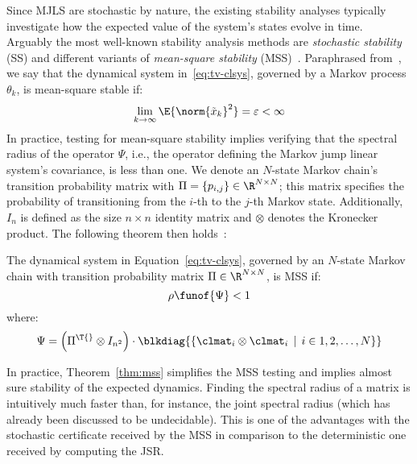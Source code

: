 Since MJLS are stochastic by nature, the existing stability analyses typically investigate how the expected value of the system's states evolve in time.
Arguably the most well-known stability analysis methods are \emph{stochastic stability} (SS) and different variants of \emph{mean-square stability} (MSS)~\cite{Feng:1992}.
Paraphrased from~\cite{Costa:2005}, we say that the dynamical system in~\eqref{eq:tv-clsys}, governed by a Markov process $\theta_k$, is mean-square stable if:
%
\begin{equation*}%
    \lim_{k\rightarrow \infty} \E{\norm{\tilde{x}_k}^2} = \varepsilon < \infty
\end{equation*}
%
In practice, testing for mean-square stability implies verifying that the spectral radius of the operator $\Psi$, i.e., the operator defining the Markov jump linear system's covariance, is less than one.
We denote an $N$-state Markov chain's transition probability matrix with $\Pi = \left\{ p_{i,j} \right\} \in \R^{N \times N}$; this matrix specifies the probability of transitioning from the $i$-th to the $j$-th Markov state.
Additionally, $I_{n}$ is defined as the size $n \times n $ identity matrix and $\otimes$ denotes the Kronecker product.
The following theorem then holds~\cite{Costa:2005}:
%
\begin{theorem}%
    \label{thm:mss}%
    The dynamical system in Equation~\eqref{eq:tv-clsys}, governed by an $N$-state Markov chain with transition probability matrix $\Pi \in \R^{N \times N}$, is MSS if:
    \begin{equation*}%
        \rho\funof{\Psi} < 1
    \end{equation*}
    where:
    \begin{equation*}%
        \Psi = \left( \Pi^\T{} \otimes I_{n^2} \right) \cdot \blkdiag{ \left\{ \clmat_i \otimes \clmat_i \, \mid \, i \in 1, 2, \ldots, N \right\} }
    \end{equation*}
\end{theorem}
%
In practice, Theorem~\ref{thm:mss} simplifies the MSS testing and implies almost sure stability of the expected dynamics.
Finding the spectral radius of a matrix is intuitively much faster than, for instance, the joint spectral radius (which has already been discussed to be undecidable).
This is one of the advantages with the stochastic certificate received by the MSS in comparison to the deterministic one received by computing the JSR.



